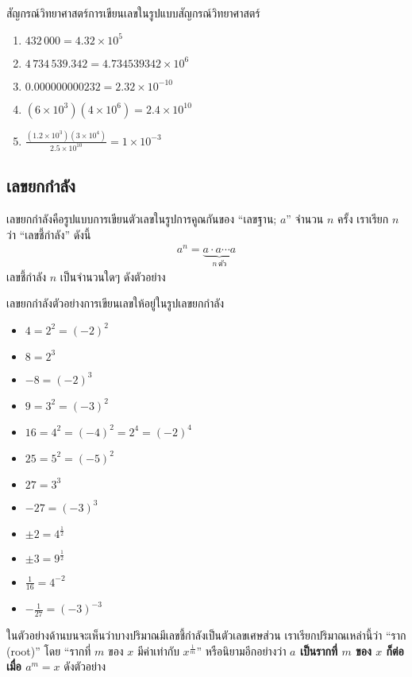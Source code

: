 \begin{example}{สัญกรณ์วิทยาศาสตร์}การเขียนเลขในรูปแบบสัญกรณ์วิทยาศาสตร์
\begin{enumerate}
   \item $432\,000=4.32\times 10^5$
	\item $4\,734\,539.342=4.734539342\times 10^6$
	\item $0.000000000232=2.32\times 10^{-10}$
	\item $(6\times 10^3)(4\times 10^6)=2.4\times 10^{10}$
	\item $\frac{(1.2\times 10^3)(3\times 10^{4})}{2.5\times 10^{10}}=1\times 10^{-3}$
\end{enumerate}

\end{example}


\subsection{เลขยกกำลัง}
\noindent เลขยกกำลังคือรูปแบบการเขียนตัวเลขในรูปการคูณกันของ ``เลขฐาน; $a$'' จำนวน $n$ ครั้ง เราเรียก $n$ ว่า ``เลขชี้กำลัง'' ดังนี้
\begin{align}
    a^n = \underset{n\,\mathrm{ตัว}}{\underbrace{a\cdot a \cdots a}}
\end{align}
เลขชี้กำลัง $n$ เป็นจำนวนใดๆ ดังตัวอย่าง
\begin{example}{เลขยกกำลัง}ตัวอย่างการเขียนเลขให้อยู่ในรูปเลขยกกำลัง
\begin{itemize}
	\item $4 = 2^2=(-2)^2$
	\item $8 = 2^3$
	\item $-8 = (-2)^3$
	\item $9 = 3^2 = (-3)^2$
	\item $16 = 4^2=(-4)^2=2^4=(-2)^4$
	\item $25 = 5^2 = (-5)^2$
	\item $27 = 3^3$
	\item $-27 = (-3)^3$
	\item $\pm 2 = 4^{\frac{1}{2}}$
	\item $\pm 3 = 9^{\frac{1}{2}}$
	\item $\frac{1}{16}=4^{-2}$
	\item $-\frac{1}{27}=(-3)^{-3}$
\end{itemize}
\end{example}  
ในตัวอย่างด้านบนจะเห็นว่าบางปริมาณมีเลขชี้กำลังเป็นตัวเลขเศษส่วน  เราเรียกปริมาณเหล่านี้ว่า ``ราก (root)''   โดย ``รากที่ $m$ ของ $x$ มีค่าเท่ากับ $x^{\frac{1}{m}}$'' หรือนิยามอีกอย่างว่า \textbf{$a$ เป็นรากที่ $m$  ของ $x$ ก็ต่อเมื่อ $a^m=x$} ดังตัวอย่าง
